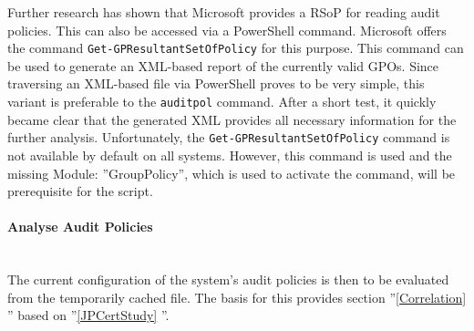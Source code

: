 Further research has shown that Microsoft provides a RSoP \cite{RSoP} for reading audit policies. This can also be accessed via a PowerShell command. Microsoft offers the command \lstinline|Get-GPResultantSetOfPolicy| \cite{GetGPResultantSetOfPolicy} for this purpose. This command can be used to generate an XML-based report of the currently valid GPOs. Since traversing an XML-based file via PowerShell proves to be very simple, this variant is preferable to the \lstinline|auditpol| command. After a short test, it quickly became clear that the generated XML provides all necessary information for the further analysis. Unfortunately, the \lstinline|Get-GPResultantSetOfPolicy| command is not available by default on all systems. However, this command is used and the missing Module: ''GroupPolicy'', which is used to activate the command, will be prerequisite for the script. \cite{GroupPolicy} \cite{RSAT}


\paragraph{Analyse Audit Policies} \ \\
The current configuration of the system's audit policies is then to be evaluated from the temporarily cached file. The basis for this provides section ''\ref{Correlation} '' based on ''\ref{JPCertStudy} ''.

\clearpage 

